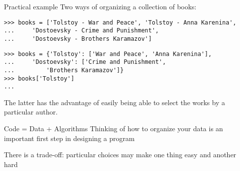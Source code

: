 \documentclass[aspectratio=169,usenames,dvipsnames]{beamer}
\begin{document}
\begin{frame}[fragile]{Practical example}
Two ways of organizing a collection of books:
\begin{lstlisting}
>>> books = ['Tolstoy - War and Peace', 'Tolstoy - Anna Karenina',
...     'Dostoevsky - Crime and Punishment',
...     'Dostoevsky - Brothers Karamazov']
\end{lstlisting}

\pause
\begin{lstlisting}
>>> books = {'Tolstoy': ['War and Peace', 'Anna Karenina'],
...     'Dostoevsky': ['Crime and Punishment',
...         'Brothers Karamazov']}
>>> books['Tolstoy']
...
\end{lstlisting}
The latter has the advantage of easily being able to
select the works by a particular author.
\end{frame}

\begin{frame}{Code = Data + Algorithms}
    Thinking of how to organize your data
    is an important first step in designing a program

    There is a trade-off:
    particular choices may make one thing easy and another hard
\end{frame}
\end{document}
